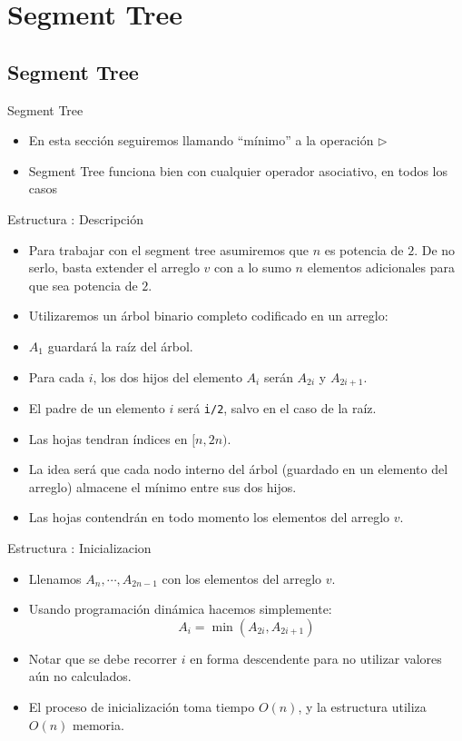 \documentclass{beamer}
\DeclareMathOperator*{\mimin}{min}
\begin{document}
\section{Segment Tree}

\subsection{Segment Tree}

\begin{frame}{Segment Tree}
    \begin{itemize}
      \item En esta sección seguiremos llamando ``mínimo'' a la operación $\triangleright$
      \item Segment Tree funciona bien con cualquier operador asociativo, en todos los casos
    \end{itemize}
\end{frame}

\begin{frame}{Estructura : Descripción}
    \begin{itemize}
      \item Para trabajar con el segment tree asumiremos que $n$ es potencia de $2$. De no serlo, basta extender el arreglo $v$ con a lo sumo $n$
            elementos adicionales para que sea potencia de $2$.
      \item Utilizaremos un árbol binario completo codificado en un arreglo:
      \item $A_1$ guardará la raíz del árbol.
      \item Para cada $i$, los dos hijos del elemento $A_i$ serán $A_{2i}$ y $A_{2i+1}$.
      \item El padre de un elemento $i$ será \texttt{i/2}, salvo en el caso de la raíz.
      \item Las hojas tendran índices en $[n,2n)$.
      \item La idea será que cada nodo interno del árbol (guardado en un elemento del arreglo) almacene el mínimo entre sus dos hijos.
      \item Las hojas contendrán en todo momento los elementos del arreglo $v$.
    \end{itemize}
\end{frame}

\begin{frame}{Estructura : Inicializacion}
    \begin{itemize}
       \item Llenamos $A_n, \cdots, A_{2n-1}$ con los elementos del arreglo $v$.
       \item Usando programación dinámica hacemos simplemente:
        $$A_i = \mimin(A_{2i},A_{2i+1})$$
        \item Notar que se debe recorrer $i$ en forma descendente para no utilizar valores aún no calculados.
        \item El proceso de inicialización toma tiempo $O(n)$, y la estructura utiliza $O(n)$ memoria.
    \end{itemize}
\end{frame}
\end{document}
